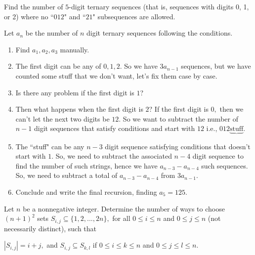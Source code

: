 \documentclass[11pt]{article}
\begin{document}
\begin{exam}
Find the number of $5$-digit ternary sequences (that is, sequences with digits 0, 1, or 2) where no ``$012$" and ``$21$" subsequences are allowed.
\end{exam}

\begin{walk}
Let $a_n$ be the number of $n$ digit ternary sequences following the conditions.
\begin{enumerate}
\item Find $a_1, a_2, a_3$ manually.
\item The first digit can be any of $0, 1, 2.$ So we have $3a_{n-1}$ sequences, but we have counted some stuff that we don't want, let's fix them case by case.
\item Is there any problem if the first digit is $1$? 
\item Then what happens when the first digit is $2$?
If the first digit is $0,$ then we can't let the next two digits be $12$. So we want to subtract the number of $n-1$ digit sequences that satisfy conditions and start with $12$ i.e., $012\underbrace{\text{stuff}}.$
\item The ``stuff" can be any $n-3$ digit sequence satisfying conditions that doesn't start with $1$. So, we need to subtract the associated $n-4$ digit sequence to find the number of such strings, hence we have $a_{n-3} - a_{n-4}$ such sequences.
So, we need to subtract a total of $a_{n-3} - a_{n-4}$ from $3a_{n-1}.$  
\item Conclude and write the final recursion, finding $a_5 = 125.$
\end{enumerate}
\end{walk}








%
%


\begin{exam}
[USAJMO 2019/5] Let $n$ be a nonnegative integer. Determine the number of ways to choose $(n+1)^2$ sets $S_{i,j} \subseteq \{1, 2, . . . , 2n\},$
for all $0 \leq i \leq n$ and $0 \leq j \leq n$ (not necessarily distinct), such that
\begin{itemize}
\Item $|S_{i,j}| = i + j,$ and
\Item $S_{i,j} \subseteq S_{k,l}$ if $0 \leq i \leq k \leq n$ and $0 \leq j \leq l \leq n.$
\end{itemize}
\end{exam}
\end{document}

